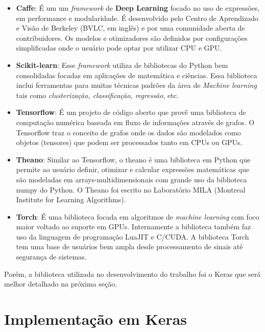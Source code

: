 \documentclass[
	12pt,				%
	oneside,			%
	a4paper,			%
	english,			%
	french,				%
	spanish,			%
	brazil,				%
	]{abntex2}
\begin{document}
\begin{itemize}
  
\item \textbf{Caffe}: É um um \textit{framework} de \textbf{Deep Learning} focado no uso de expressões, em performance e modularidade. É desenvolvido pelo Centro de Aprendizado e Visão de Berkeley (BVLC, em inglês) e por uma comunidade aberta de contribuidores. Os modelos e otimizadores são definidos por configurações simplificadas onde o usuário pode optar por utilizar CPU e GPU.
  
\item \textbf{Scikit-learn}: Esse \textit{framework} utiliza de bibliotecas do Python bem consolidadas focadas em aplicações de matemática e ciências. Essa biblioteca inclui ferramentas para muitas técnicas padrões da área de \textit{Machine learning} tais como \textit{clusterização, classificação, regressão}, etc.
  
\item \textbf{Tensorflow}: É um projeto de código aberto que provê uma biblioteca de computação numérica baseada em fluxo de informações através de grafos. O Tensorflow traz o conceito de grafos onde os dados são modelados como objetos (tensores) que podem ser processados tanto em CPUs ou GPUs.
  
\item \textbf{Theano}: Similar ao Tensorflow, o theano é uma biblioteca em Python que permite ao usuário definir, otimizar e calcular expressões matemáticas que são modeladas em arrays-multidimensionais com grande uso da biblioteca numpy do Python. O Theano foi escrito no Laboratório MILA (Montreal Institute for Learning Algorithms).
  
\item \textbf{Torch}: É uma biblioteca focada em algoritmos de \textit{machine learning} com foco maior voltado ao suporte em GPUs. Internamente a biblioteca também faz uso da linguagem de programação LuaJIT e C/CUDA. A biblioteca Torch tem uma base de usuários bem ampla desde processamento de sinais até segurança de sistemas.
  
\end{itemize}

\par Porém, a biblioteca utilizada no desenvolvimento do trabalho foi o Keras que será melhor detalhado na próxima seção.

\newpage
\section{Implementação em Keras}
\end{document}
